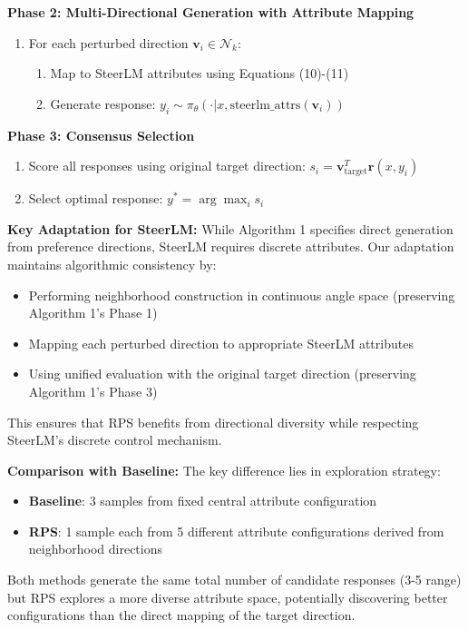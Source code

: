 \documentclass{article} %
\begin{document}
\textbf{Phase 2: Multi-Directional Generation with Attribute Mapping}
\begin{enumerate}
    \item For each perturbed direction $\mathbf{v}_i \in \mathcal{N}_k$:
    \begin{enumerate}
        \item Map to SteerLM attributes using Equations (10)-(11)
        \item Generate response: $y_i \sim \pi_\theta(\cdot | x, \text{steerlm\_attrs}(\mathbf{v}_i))$
    \end{enumerate}
\end{enumerate}

\textbf{Phase 3: Consensus Selection}
\begin{enumerate}
    \item Score all responses using original target direction: $s_i = \mathbf{v}_{\text{target}}^T \mathbf{r}(x, y_i)$
    \item Select optimal response: $y^* = \arg\max_i s_i$
\end{enumerate}

\textbf{Key Adaptation for SteerLM:} While Algorithm 1 specifies direct generation from preference directions, SteerLM requires discrete attributes. Our adaptation maintains algorithmic consistency by:
\begin{itemize}
    \item Performing neighborhood construction in continuous angle space (preserving Algorithm 1's Phase 1)
    \item Mapping each perturbed direction to appropriate SteerLM attributes
    \item Using unified evaluation with the original target direction (preserving Algorithm 1's Phase 3)
\end{itemize}

This ensures that RPS benefits from directional diversity while respecting SteerLM's discrete control mechanism.

\textbf{Comparison with Baseline:} The key difference lies in exploration strategy:
\begin{itemize}
    \item \textbf{Baseline}: 3 samples from fixed central attribute configuration
    \item \textbf{RPS}: 1 sample each from 5 different attribute configurations derived from neighborhood directions
\end{itemize}

Both methods generate the same total number of candidate responses (3-5 range) but RPS explores a more diverse attribute space, potentially discovering better configurations than the direct mapping of the target direction.
\end{document}
